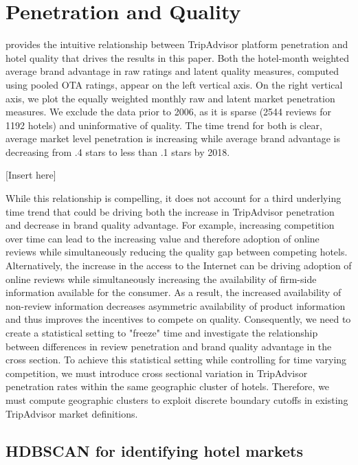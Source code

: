 \documentclass[mksc,blindrev]{informs3} %
\begin{document}
\section{Penetration and Quality} \label{sec:mainstudy}

 provides the intuitive relationship between TripAdvisor platform penetration and hotel quality that drives the results in this paper. Both the hotel-month weighted average brand advantage in raw ratings and latent quality measures, computed using pooled OTA ratings, appear on the left vertical axis. On the right vertical axis, we plot the equally weighted monthly raw and latent market penetration measures. We exclude the data prior to 2006, as it is sparse (2544 reviews for 1192 hotels) and uninformative of quality. The time trend for both is clear, average market level penetration is increasing while average brand advantage is decreasing from .4 stars to less than .1 stars by 2018. 

[Insert  here]

While this relationship is compelling, it does not account for a third underlying time trend that could be driving both the increase in TripAdvisor penetration and decrease in brand quality advantage. For example, increasing competition over time can lead to the increasing value and therefore adoption of online reviews while simultaneously reducing the quality gap between competing hotels. Alternatively, the increase in the access to the Internet can be driving adoption of online reviews while simultaneously increasing the availability of firm-side information available for the consumer. As a result, the increased availability of non-review information decreases asymmetric availability of product information and thus improves the incentives to compete on quality. Consequently, we need to create a statistical setting to "freeze" time and investigate the relationship between differences in review penetration and brand quality advantage in the cross section. To achieve this statistical setting while controlling for time varying competition, we must introduce cross sectional variation in TripAdvisor penetration rates within the same geographic cluster of hotels. Therefore, we must compute geographic clusters to exploit discrete boundary cutoffs in existing TripAdvisor market definitions. 

\subsection{HDBSCAN for identifying hotel markets}\label{sec:hdbscan}
\end{document}

